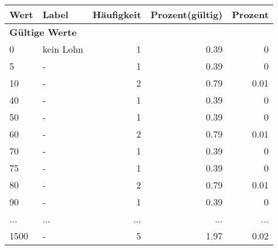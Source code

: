      \begin{longtable}{lXrrr}
     \toprule
     \textbf{Wert} & \textbf{Label} & \textbf{Häufigkeit} & \textbf{Prozent(gültig)} & \textbf{Prozent} \\
     \endhead
     \midrule
     \multicolumn{5}{l}{\textbf{Gültige Werte}}\\
        0 & \multicolumn{1}{X}{kein Lohn} & %
          \num{1} &
          \num[round-mode=places,round-precision=2]{0.39} &
          \num[round-mode=places,round-precision=2]{0} \\
        5 & \multicolumn{1}{X}{-} & %
          \num{1} &
          \num[round-mode=places,round-precision=2]{0.39} &
          \num[round-mode=places,round-precision=2]{0} \\
        10 & \multicolumn{1}{X}{-} & %
          \num{2} &
          \num[round-mode=places,round-precision=2]{0.79} &
          \num[round-mode=places,round-precision=2]{0.01} \\
        40 & \multicolumn{1}{X}{-} & %
          \num{1} &
          \num[round-mode=places,round-precision=2]{0.39} &
          \num[round-mode=places,round-precision=2]{0} \\
        50 & \multicolumn{1}{X}{-} & %
          \num{1} &
          \num[round-mode=places,round-precision=2]{0.39} &
          \num[round-mode=places,round-precision=2]{0} \\
        60 & \multicolumn{1}{X}{-} & %
          \num{2} &
          \num[round-mode=places,round-precision=2]{0.79} &
          \num[round-mode=places,round-precision=2]{0.01} \\
        70 & \multicolumn{1}{X}{-} & %
          \num{1} &
          \num[round-mode=places,round-precision=2]{0.39} &
          \num[round-mode=places,round-precision=2]{0} \\
        75 & \multicolumn{1}{X}{-} & %
          \num{1} &
          \num[round-mode=places,round-precision=2]{0.39} &
          \num[round-mode=places,round-precision=2]{0} \\
        80 & \multicolumn{1}{X}{-} & %
          \num{2} &
          \num[round-mode=places,round-precision=2]{0.79} &
          \num[round-mode=places,round-precision=2]{0.01} \\
        90 & \multicolumn{1}{X}{-} & %
          \num{1} &
          \num[round-mode=places,round-precision=2]{0.39} &
          \num[round-mode=places,round-precision=2]{0} \\
       ... & ... & ... & ... & ... \\
        1500 & \multicolumn{1}{X}{-} & %
          \num{5} &
          \num[round-mode=places,round-precision=2]{1.97} &
          \num[round-mode=places,round-precision=2]{0.02} \\


\end{longtable}

